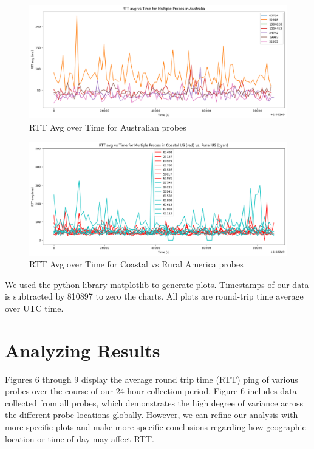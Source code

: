 \documentclass[acmsmall]{acmart}
\begin{document}
\begin{figure}[h]
  \centering
  \includegraphics[width=\linewidth]{graph_aus.png}
  \caption{RTT Avg over Time for Australian probes}
  \Description{ }
\end{figure}

\begin{figure}[h]
  \centering
  \includegraphics[width=\linewidth]{graph_coastal_rural.png}
  \caption{RTT Avg over Time for Coastal vs Rural America probes}
  \Description{ }
\end{figure}

We used the python library matplotlib to generate plots. Timestamps of our data is subtracted by 810897 to zero the charts. All plots are round-trip time average over UTC time.


\section{Analyzing Results}

Figures 6 through 9 display the average round trip time (RTT) ping of various probes over the course of our 24-hour collection period. Figure 6 includes data collected from all probes, which demonstrates the high degree of variance across the different probe locations globally. However, we can refine our analysis with more specific plots and make more specific conclusions regarding how geographic location or time of day may affect RTT. 
\end{document}

